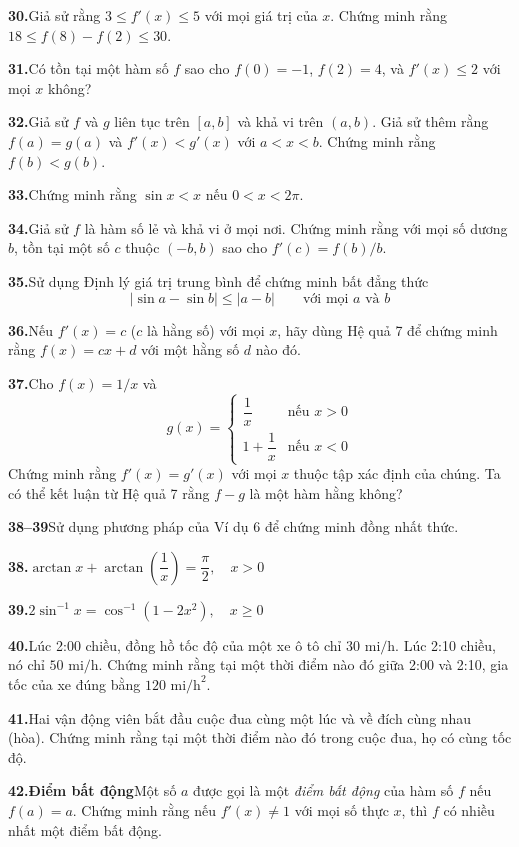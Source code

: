 \begin{minipage}[t]{0.485\textwidth}
  \vspace{0pt}
  \setlength{\parskip}{3.5pt}

  \textbf{30.}\enspace Giả sử rằng $3 \le f'(x) \le 5$ với mọi giá trị của $x$. Chứng minh rằng $18 \le f(8) - f(2) \le 30$.

  \textbf{31.}\enspace Có tồn tại một hàm số $f$ sao cho $f(0) = -1$, $f(2) = 4$, và $f'(x) \le 2$ với mọi $x$ không?

  \textbf{32.}\enspace Giả sử $f$ và $g$ liên tục trên $[a, b]$ và khả vi trên $(a, b)$. Giả sử thêm rằng $f(a) = g(a)$ và $f'(x) < g'(x)$ với $a < x < b$. Chứng minh rằng $f(b) < g(b)$.\enspace [\textit{Gợi ý:} Áp dụng Định lý giá trị trung bình cho hàm số $h = f - g$.]

  \textbf{33.}\enspace Chứng minh rằng $\sin x < x$ nếu $0 < x < 2\pi$.

  \textbf{34.}\enspace Giả sử $f$ là hàm số lẻ và khả vi ở mọi nơi. Chứng minh rằng với mọi số dương $b$, tồn tại một số $c$ thuộc $(-b, b)$ sao cho $f'(c) = f(b)/b$.

  \textbf{35.}\enspace Sử dụng Định lý giá trị trung bình để chứng minh bất đẳng thức
  \[
    |\sin a - \sin b| \le |a - b| \qquad \text{với mọi } a \text{ và } b
  \]

  \textbf{36.}\enspace Nếu $f'(x) = c$ ($c$ là hằng số) với mọi $x$, hãy dùng Hệ quả 7 để chứng minh rằng $f(x) = cx + d$ với một hằng số $d$ nào đó.

  \textbf{37.}\enspace Cho $f(x) = 1/x$ và
  \[
    g(x) = \begin{cases}
      \dfrac{1}{x} & \text{nếu } x > 0 \\[6pt]
      1 + \dfrac{1}{x} & \text{nếu } x < 0
    \end{cases}
  \]
  Chứng minh rằng $f'(x) = g'(x)$ với mọi $x$ thuộc tập xác định của chúng. Ta có thể kết luận từ Hệ quả 7 rằng $f - g$ là một hàm hằng không?

  {\color{stewartcyan}\textbf{38--39}}\enspace Sử dụng phương pháp của Ví dụ 6 để chứng minh đồng nhất thức.

  \textbf{38.}\enspace $\arctan x + \arctan\left(\dfrac{1}{x}\right) = \dfrac{\pi}{2}, \quad x > 0$

  \textbf{39.}\enspace $2\sin^{-1}x = \cos^{-1}(1 - 2x^2), \quad x \ge 0$

  \textbf{40.}\enspace Lúc 2:00 chiều, đồng hồ tốc độ của một xe ô tô chỉ $30\text{ mi/h}$. Lúc 2:10 chiều, nó chỉ $50\text{ mi/h}$. Chứng minh rằng tại một thời điểm nào đó giữa 2:00 và 2:10, gia tốc của xe đúng bằng $120\text{ mi/h}^2$.

  \textbf{41.}\enspace Hai vận động viên bắt đầu cuộc đua cùng một lúc và về đích cùng nhau (hòa). Chứng minh rằng tại một thời điểm nào đó trong cuộc đua, họ có cùng tốc độ.\enspace [\textit{Gợi ý:} Xét hàm số $f(t) = g(t) - h(t)$, trong đó $g$ và $h$ là hàm vị trí của hai vận động viên.]

  \textbf{42.}\enspace \textbf{Điểm bất động}\enspace Một số $a$ được gọi là một \textit{điểm bất động} của hàm số $f$ nếu $f(a) = a$. Chứng minh rằng nếu $f'(x) \ne 1$ với mọi số thực $x$, thì $f$ có nhiều nhất một điểm bất động.
\end{minipage}

